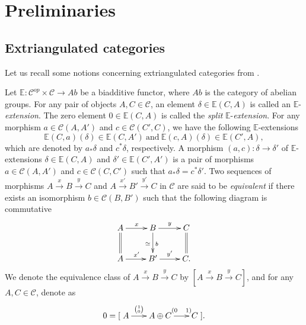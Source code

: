 \documentclass[11pt,a4paper]{amsart}
\numberwithin{equation}{section}
\theoremstyle{plain}
\begin{document}
\section{\bf Preliminaries}


\subsection{Extriangulated categories}
Let us recall some notions concerning extriangulated categories from \cite{NP}.


Let $\mathbb{E}:\mathscr{C}^{op}\times\mathscr{C}\rightarrow Ab$ be a biadditive functor, where $Ab$ is the category of abelian groups. For any pair of objects $A,C\in\mathscr{C}$, an element $\delta\in\mathbb{E}(C,A)$ is called an
$\mathbb{E}$-{\em extension}. The zero element $0\in\mathbb{E}(C,A)$ is called the {\em split} $\mathbb{E}$-{\em extension}. For any morphism $a\in\mathscr{C}(A,A')$ and $c\in\mathscr{C}(C',C)$, we have the following $\mathbb{E}$-extensions
$$\mathbb{E}(C,a)(\delta)\in\mathbb{E}(C,A')~\text{and}~\mathbb{E}(c,A)(\delta)\in\mathbb{E}(C',A),$$
which are denoted by $a_*\delta$ and $c^*\delta$, respectively.
A morphism $(a,c):\delta\rightarrow \delta'$ of $\mathbb{E}$-extensions $\delta\in\mathbb{E}(C,A)$ and $\delta'\in\mathbb{E}(C',A')$ is a pair of morphisms $a\in\mathscr{C}(A,A')$ and $c\in\mathscr{C}(C,C')$ such that $a_*\delta=c^*\delta'$.
Two sequences of morphisms $A\stackrel{x}{\longrightarrow}B\stackrel{y}{\longrightarrow}C$ and $A\stackrel{x'}{\longrightarrow}B'\stackrel{y'}{\longrightarrow}C$ in $\mathscr{C}$ are said to be {\em equivalent} if there exists an isomorphism $b\in\mathscr{C}(B,B')$ such that the following diagram is commutative
$$\xymatrix{A \ar[r]^x \ar@{=}[d]& B\ar[r]^y \ar[d]^b_{\simeq}&C\ar@{=}[d]\\
	A\ar[r]^{x'}&B'\ar[r]^{y'}&C.}$$
We denote the equivalence class of $A\stackrel{x}{\longrightarrow}B\stackrel{y}{\longrightarrow}C$ by $[A\stackrel{x}{\longrightarrow}B\stackrel{y}{\longrightarrow}C]$, and for any $A,C\in\mathscr{C}$, denote as
\[
0=
[
\xymatrix@C=1.8em{
	A \ar[r]^-{\binom{1}{0}}
	& A\oplus C \ar[r]^-{(0\quad1)}
	& C
}
].
\]
\end{document}
